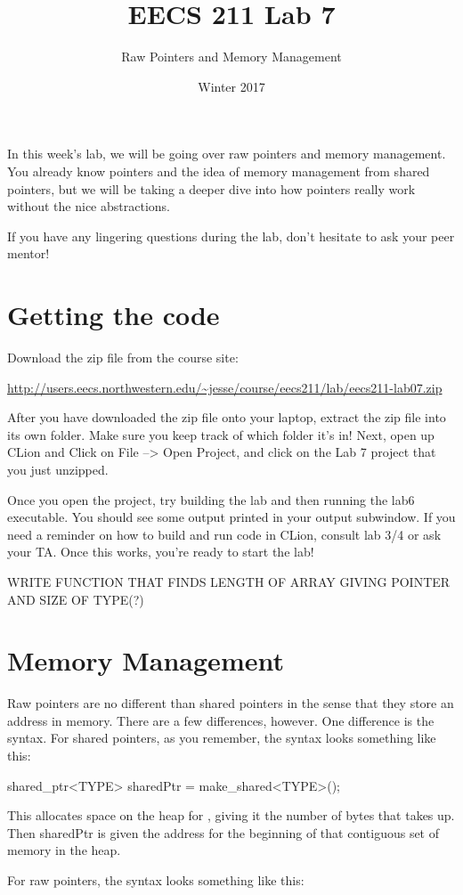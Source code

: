 \documentclass{tufte-handout}
\title{EECS 211 Lab 7}
\author{Raw Pointers and Memory Management}
\date{Winter 2017}
\begin{document}
\maketitle

In this week's lab, we will be going over raw pointers and memory management.
You already know pointers and the idea of memory management from shared pointers, but we will be taking a deeper dive into how pointers really work without the nice abstractions.

If you have any lingering questions during the lab, don't hesitate to ask your peer mentor!
\section{Getting the code}
Download the zip file from the course site: \medskip

\url{http://users.eecs.northwestern.edu/~jesse/course/eecs211/lab/eecs211-lab07.zip}

\medskip \noindent
After you have downloaded the zip file onto your laptop, extract the zip file into its own folder. Make sure you keep track of which folder it's in!  Next, open up CLion and Click on File --> Open Project, and click on the Lab 7 project that you just unzipped. 

Once you open the project, try building the lab and then running the lab6 executable. 
You should see some output printed in your output subwindow.
If you need a reminder on how to build and run code in CLion, consult lab 3/4 or ask your TA.
Once this works, you're ready to start the lab!

WRITE FUNCTION THAT FINDS LENGTH OF ARRAY GIVING POINTER AND SIZE OF TYPE(?)
\section{Memory Management}
Raw pointers are no different than shared pointers in the sense that they store an address in memory.
There are a few differences, however.
One difference is the syntax.
For shared pointers, as you remember, the syntax looks something like this:
\begin{Code}
    shared_ptr<TYPE> sharedPtr = make_shared<TYPE>();
\end{Code}
This allocates space on the heap for , giving it the number of bytes that  takes up.
Then sharedPtr is given the address for the beginning of that contiguous set of memory in the heap.


For raw pointers, the syntax looks something like this:
\end{document}
